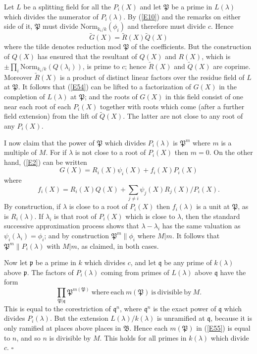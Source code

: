 \documentclass[12pt]{article}
\def\fB{{\mathfrak B}}
\def\fp{{\mathfrak p}}
\def\fP{{\mathfrak P}}
\def\fq{{\mathfrak q}}
\def\gl{{\lambda}}
\def\qed{{\hfill$\square$}}
\def\beq{\begin{equation} \label}
\begin{document}
Let $L$ be a splitting field for all the $P_i(X)$ and let $\fP$ be a
prime in $L(\gl)$ which divides the numerator of $P_i(\gl)$. By (\ref{E10})
and the remarks on either side of it, $\fP$ must divide Norm$_{k_i/k}(\phi_i)$
and therefore must divide $c$. Hence
\beq{E54} \tilde{G}(X)=\tilde{R}(X)\tilde{Q}(X) \end{equation}
where the tilde denotes reduction mod $\fP$ of the coefficients. But the
construction of $Q(X)$ has ensured that the resultant of $Q(X)$ and $R(X)$,
which is $\pm\prod_i{\mathrm{Norm}}_{k_i/k}(Q(\gl_i))$, is prime to $c$; hence
$\tilde{R}(X)$ and $\tilde{Q}(X)$ are coprime. Moreover $\tilde{R}(X)$ is a
product of distinct linear factors over the residue field of $L$
at $\fP$. It follows that (\ref{E54}) can be lifted
to a factorization of $G(X)$ in the completion of $L(\gl)$ at $\fP$; and the
roots of $G(X)$ in this field consist of one near each root of each $P_i(X)$
together with roots which come (after a further field extension) from the lift
of $\tilde{Q}(X)$. The latter are not close to any root of any $P_i(X)$.

I now claim that the power of $\fP$ which divides $P_i(\gl)$ is $\fP^m$ where
$m$ is a multiple of $M$. For if $\gl$ is not close to a root of $P_i(X)$ then
$m=0$. On the other hand, (\ref{E2}) can be written
\[ G(X)=R_i(X)\psi_i(X)+f_i(X)P_i(X) \]
where
\[ f_i(X)=R_i(X)Q(X)+\sum_{j\neq i}\psi_j(X)R_j(X)/P_i(X). \]
By construction, if $\gl$ is close to a root of $P_i(X)$ then
$f_i(\gl)$ is a unit at $\fP$, as is $R_i(\gl)$. If
$\gl_i$ is that root of $P_i(X)$ which is close to $\gl$, then the
standard successive approximation process shows that $\gl-\gl_i$ has the
same valuation as $\psi_i(\gl_i)=\phi_i$; and by construction $\fP^m\|\phi_i$
where $M|m$. It follows that $\fP^m\|P_i(\gl)$ with $M|m$, as claimed, in both
cases.

Now let $\fp$ be a prime in $k$ which divides $c$, and let $\fq$ be any prime
of $k(\gl)$ above $\fp$. The factors of $P_i(\gl)$ coming from primes of
$L(\gl)$ above $\fq$ have the form
\beq{E55} \prod_{\fP|\fq}\fP^{m(\fP)} {\mathrm{~where~each~}}
m(\fP) {\mathrm{~is~divisible~by~}} M. \end{equation}
This is equal to the corestriction of $\fq^n$, where $\fq^n$ is the exact
power of $\fq$ which divides $P_i(\gl)$. But the 
extension $L(\gl)/k(\gl)$ is unramified at $\fq$, because it is only ramified
at places above places in $\fB$. Hence each $m(\fP)$ in (\ref{E55}) is equal to
$n$, and so $n$ is divisible by $M$. This holds for all primes in $k(\gl)$
which divide $c$.  \qed
\end{document}
